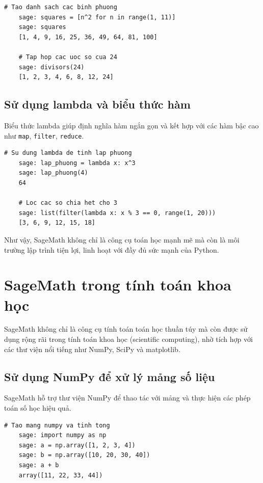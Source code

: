 \begin{lstlisting}[basicstyle=\ttfamily\small]
	# Tao danh sach cac binh phuong
	sage: squares = [n^2 for n in range(1, 11)]
	sage: squares
	[1, 4, 9, 16, 25, 36, 49, 64, 81, 100]
	
	# Tap hop cac uoc so cua 24
	sage: divisors(24)
	[1, 2, 3, 4, 6, 8, 12, 24]
\end{lstlisting}

\subsection{Sử dụng lambda và biểu thức hàm}
Biểu thức lambda giúp định nghĩa hàm ngắn gọn và kết hợp với các hàm bậc cao như \texttt{map}, \texttt{filter}, \texttt{reduce}.

\begin{lstlisting}[basicstyle=\ttfamily\small]
	# Su dung lambda de tinh lap phuong
	sage: lap_phuong = lambda x: x^3
	sage: lap_phuong(4)
	64
	
	# Loc cac so chia het cho 3
	sage: list(filter(lambda x: x % 3 == 0, range(1, 20)))
	[3, 6, 9, 12, 15, 18]
\end{lstlisting}

Như vậy, SageMath không chỉ là công cụ toán học mạnh mẽ mà còn là môi trường lập trình tiện lợi, linh hoạt với đầy đủ sức mạnh của Python.

\section{SageMath trong tính toán khoa học}
	
SageMath không chỉ là công cụ tính toán toán học thuần túy mà còn được sử dụng rộng rãi trong tính toán khoa học (scientific computing), nhờ tích hợp với các thư viện nổi tiếng như NumPy, SciPy và matplotlib.

\subsection{Sử dụng NumPy để xử lý mảng số liệu}

SageMath hỗ trợ thư viện NumPy để thao tác với mảng và thực hiện các phép toán số học hiệu quả.

\begin{lstlisting}[basicstyle=\ttfamily\small]
	# Tao mang numpy va tinh tong
	sage: import numpy as np
	sage: a = np.array([1, 2, 3, 4])
	sage: b = np.array([10, 20, 30, 40])
	sage: a + b
	array([11, 22, 33, 44])
\end{lstlisting}

